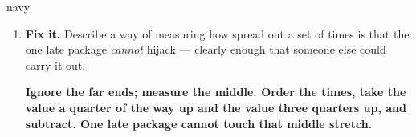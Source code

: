 \documentclass[12pt]{article}
\newcommand{\answerspace}[2]{\par\nopagebreak\noindent\begin{minipage}[t][#1][t]{\linewidth}%
  \color{keyred}\bfseries #2\end{minipage}\par}
\begin{document}
\begin{scenariobox}{navy}
\begin{enumerate}[label=\textbf{\alph*.}, leftmargin=1.8em, itemsep=4pt]
        \vspace{2pt}
        \begin{center}
        \end{center}
        \vspace{1pt}

        Work out your number from part (b) for Route C and compare it with Route B's. Then say
        what your number is claiming about Route C that simply is not true.
        \answerspace{1.8cm}{Route C: $51-27=24$ min --- Route B's number exactly. It claims C is
        as unpredictable as B, but eleven of C's twelve packages arrived between 27 and 32.
        Largest-minus-smallest sees only the two ends.}
  \item \textbf{Fix it.} Describe a way of measuring how spread out a set of times is that the
        one late package \emph{cannot} hijack --- clearly enough that someone else could carry
        it out.
        \answerspace{1.8cm}{Ignore the far ends; measure the middle. Order the times, take the
        value a quarter of the way up and the value three quarters up, and subtract. One late
        package cannot touch that middle stretch.}
\end{enumerate}
\end{scenariobox}
\end{document}
